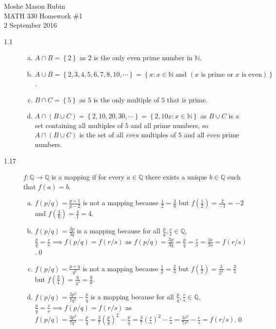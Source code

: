 \documentclass{article}
\begin{document}
	\begin{flushright}
		Moshe Mason Rubin\\MATH 330 Homework \#1\\2 September 2016
	\end{flushright}
	\begin{description}
		\item[1.1 ] 
			\begin{enumerate}[(a)]
				\item $A\cap B=\left\{2\right\}$ as $2$ is the only even prime number in $\mathbb{N}$.
				\item $A\cup B=\left\{2,3,4,5,6,7,8,10,\cdots\right\}=\left\{x:x\in\mathbb{N} \text{ and }\left(\text{$x$ is prime or $x$ is even}\right)\right\}$.
				\item $B\cap C=\left\{5\right\}$ as $5$ is the only multiple of $5$ that is prime.
				\item $A\cap\left(B\cup C\right)=\left\{2,10,20,30,\cdots\right\}=\left\{2, 10x:x\in\mathbb{N}\right\}$ as $B\cup C$ is a set containing all multiples of $5$ and all prime numbers, so $A\cap\left(B\cup C\right)$ is the set of all \textit{even} multiples of $5$ and all \textit{even} prime numbers. 
			\end{enumerate}
		
		\item[1.17] $f:\mathbb{Q}\to\mathbb{Q}$ is a mapping if for every $a\in\mathbb{Q}$ there exists a unique $b\in\mathbb{Q}$ such that $f(a)=b$. 
			\begin{enumerate}[(a)]
				\item $f\left(p/q\right)=\frac{p+1}{p-2}$ is not a mapping because $\frac{1}{2}=\frac{3}{6}$ but $f\left(\frac{1}{2}\right)=\frac{2}{-1}=-2$ and $f\left(\frac{3}{6}\right)=\frac{4}{1}=4$. 
				\item $f\left(p/q\right)=\frac{3p}{3q}$ is a mapping because for all $\frac{p}{q},\frac{r}{s}\in\mathbb{Q}$, $\frac{p}{q}=\frac{r}{s}\implies f\left(p/q\right)=f\left(r/s\right)$ as $f\left(p/q\right)=\frac{3p}{3q}=\frac{p}{q}=\frac{r}{s}=\frac{3r}{3s}=f\left(r/s\right)$.\qed
				\item $f\left(p/q\right)=\frac{p+q}{q^2}$ is not a mapping because $\frac{1}{2}=\frac{2}{4}$ but $f\left(\frac{1}{2}\right)=\frac{3}{2^2}=\frac{3}{4}$ but $f\left(\frac{2}{4}\right)=\frac{6}{4^2}=\frac{3}{8}$.
				\item $f\left(p/q\right)=\frac{3p^2}{7q^2}-\frac{p}{q}$ is a mapping because for all $\frac{p}{q},\frac{r}{s}\in\mathbb{Q}$, $\frac{p}{q}=\frac{r}{s}\implies f\left(p/q\right)=f\left(r/s\right)$ as $f\left(p/q\right)=\frac{3p^2}{7q^2}-\frac{p}{q}=\frac{3}{7}\left(\frac{p}{q}\right)^2-\frac{p}{q}=\frac{3}{7}\left(\frac{r}{s}\right)^2-\frac{r}{s}=\frac{3r^2}{7s^2}-\frac{r}{s}=f\left(r/s\right)$.\qed
			\end{enumerate}
			

\end{description}
\end{document}
